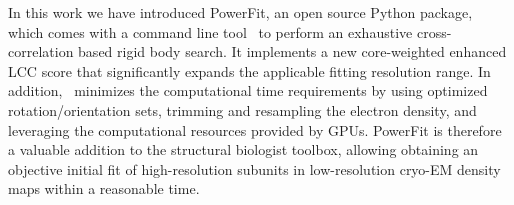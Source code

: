 
In this work we have introduced PowerFit, an open source Python package, which
comes with a command line tool \powerfit\ to perform an exhaustive
cross-correlation based rigid body search. It implements a new core-weighted
enhanced LCC score that significantly expands the applicable fitting resolution
range. In addition, \powerfit\ minimizes the computational time requirements by
using optimized rotation/orientation sets, trimming and resampling the electron
density, and leveraging the computational resources provided by GPUs. PowerFit
is therefore a valuable addition to the structural biologist toolbox, allowing
obtaining an objective initial fit of high-resolution subunits in
low-resolution cryo-EM density maps within a reasonable time.
